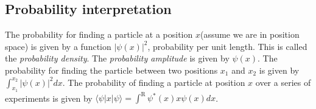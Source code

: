 \subsection{Probability interpretation}
The probability for finding a particle at a position $x$(assume we are in position space) is given by a function $|\psi(x)|^2$, probability per unit length. This is called the \textit{probability density}. The \textit{probability amplitude} is given by $\psi(x)$. The probability for finding the particle between two positions $x_1$ and $x_2$ is given by $\int^{x_2}_{x_1}|\psi(x)|^2dx$. The probability of finding a particle at position $x$ over a series of experiments is given by $\langle\psi|x|\psi\rangle = \int^\mathrm{R} \psi^*(x)x\psi(x)dx$.
